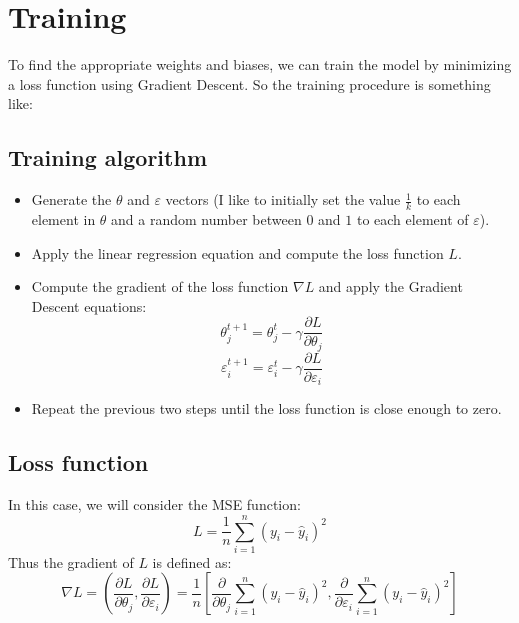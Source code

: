 \documentclass{article}
\begin{document}
\section{Training}
To find the appropriate weights and biases, we can train the model by minimizing a loss function using Gradient Descent. So the training procedure is something like:

\subsection{Training algorithm}
\begin{itemize}
    \item Generate the $\theta$ and $\varepsilon$ vectors (I like to initially set the value $\frac{1}{k}$ to each element in $\theta$ and a random number between $0$ and $1$ to each element of $\varepsilon$).
    \item Apply the linear regression equation and compute the loss function $L$.
    \item Compute the gradient of the loss function $\nabla L$ and apply the Gradient Descent equations:
    $$\theta^{t+1}_{j} = \theta^{t}_{j} - \gamma \frac{\partial L}{\partial \theta_j}$$
    $$\varepsilon^{t+1}_{i} = \varepsilon^{t}_{i} - \gamma \frac{\partial L}{\partial \varepsilon_i}$$
    \item Repeat the previous two steps until the loss function is close enough to zero.
\end{itemize}

\subsection{Loss function}
In this case, we will consider the MSE function:
$$L = \frac{1}{n} \sum^{n}_{i=1}\left(y_i - \hat{y}_i \right)^2$$
Thus the gradient of $L$ is defined as:
$$\nabla L = \left( \frac{\partial L}{\partial \theta_j}, \frac{\partial L}{\partial \varepsilon_i}\right) = \frac{1}{n} \left[ \frac{\partial}{\partial \theta_j} \sum^{n}_{i=1}\left(y_i - \hat{y}_i \right)^2, \frac{\partial}{\partial \varepsilon_i} \sum^{n}_{i=1}\left(y_i - \hat{y}_i \right)^2 \right]$$
\end{document}
